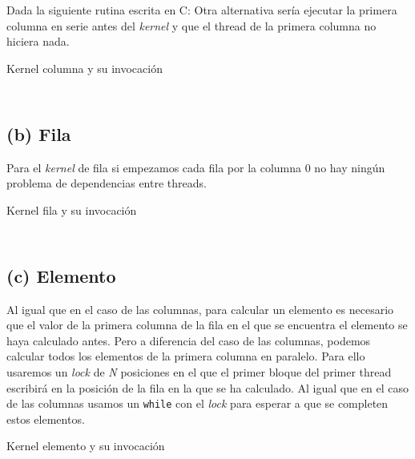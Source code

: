 \begin{pregunta}{Dada la siguiente rutina escrita en C:}
Otra alternativa sería ejecutar la primera columna en serie antes del \emph{kernel} y que el
thread de la primera columna no hiciera nada.

\begin{listing}[H]
    \caption{Kernel columna y su invocación}
    \inputminted[firstline=17,lastline=33]{cuda}{code/main.cu}
    \vspace{-2em}
    \inputminted[firstline=120,lastline=127,autogobble]{cuda}{code/main.cu}
    \label{lst:kernel-columna}
\end{listing}

\pagebreak
\subsection*{(b) Fila}

Para el \emph{kernel} de fila si empezamos cada fila por la columna 0 no hay ningún
problema de dependencias entre threads.

\begin{listing}[H]
    \caption{Kernel fila y su invocación}
    \inputminted[firstline=35,lastline=41]{cuda}{code/main.cu}
    \vspace{-2em}
    \inputminted[firstline=114,lastline=117,autogobble]{cuda}{code/main.cu}
    \label{lst:kernel-fila}
\end{listing}

\pagebreak
\subsection*{(c) Elemento}

Al igual que en el caso de las columnas, para calcular un elemento es necesario que
el valor de la primera columna de la fila en el que se encuentra el elemento se haya
calculado antes. Pero a diferencia del caso de las columnas, podemos calcular todos los
elementos de la primera columna en paralelo. Para ello usaremos un \emph{lock} de
\emph{N} posiciones en el que el primer bloque del primer thread escribirá en la posición
de la fila en la que se ha calculado. Al igual que en el caso de las columnas usamos un
\texttt{while} con el \emph{lock} para esperar a que se completen estos elementos.

\begin{listing}[H]
    \caption{Kernel elemento y su invocación}
    \inputminted[firstline=43,lastline=57]{cuda}{code/main.cu}
    \vspace{-2em}
    \inputminted[firstline=130,lastline=137,autogobble]{cuda}{code/main.cu}
    \label{lst:kernel-elemento}
\end{listing}

\nocite{noauthor_cuda_nodate}

\end{pregunta}

